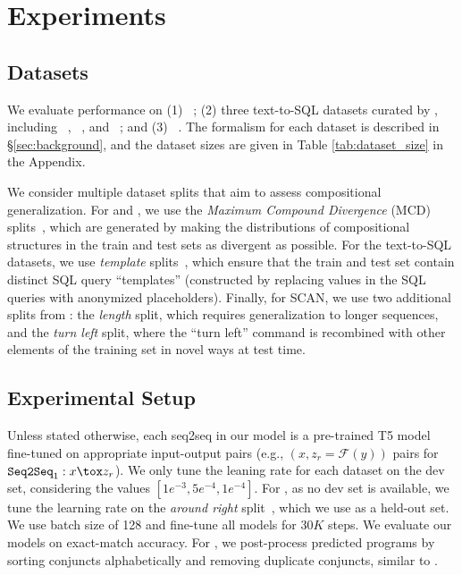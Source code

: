\section{Experiments}
\label{sec:experiments}

\subsection{Datasets}
\label{ssec:datasets}

We evaluate performance on (1) \cfq{}~\cite{keysers2019measuring}; (2) three text-to-SQL datasets curated by \citet{finegan-dollak-etal-2018-improving}, including \geo{}~\cite{zelle-mooney-1996-learning}, \atis{}~\cite{dahl-etal-1994-expanding}, and \scholar{}~\cite{iyer-etal-2017-learning};
and (3) \scan{}~\cite{lake2018generalization}.
The formalism for each dataset is described in \S\ref{sec:background}, and the dataset sizes are given in Table \ref{tab:dataset_size} in the Appendix.

We consider multiple dataset splits that aim to assess compositional generalization.
For \cfq{} and \scan{}, we use the \emph{Maximum Compound Divergence} (MCD) splits~\cite{keysers2019measuring}, which are generated by making the distributions of compositional structures in the train and test sets as divergent as possible.
For the text-to-SQL datasets, we use \emph{template} splits~\cite{finegan-dollak-etal-2018-improving}, which ensure that the train and test set contain distinct SQL query ``templates'' (constructed by replacing values in the SQL queries with anonymized placeholders).
Finally, for SCAN, we use two additional splits from \citet{lake2018generalization}: the \emph{length} split, which requires generalization to longer sequences, and the \emph{turn left} split, where the ``turn left'' command is recombined with other elements of the training set in novel ways at test time.


\subsection{Experimental Setup}
Unless stated otherwise, each seq2seq in our model is a pre-trained T5 model~\cite{raffel2020exploring} fine-tuned on appropriate input-output pairs (e.g., $(x, z_r = \mathcal{F}(y))$ pairs for $\texttt{Seq2Seq}_1: x\tox z_r$).
We only tune the leaning rate for each dataset on the dev set, considering the values $[1e^{-3}, 5e^{-4}, 1e^{-4}]$. For \scan{}, as no dev set is available, we tune the learning rate on the \textit{around right} split~\cite{loula-etal-2018-rearranging}, which we use as a held-out set. We use batch size of 128 and fine-tune all models for $30K$ steps. We evaluate our models on exact-match accuracy. 
For \cfq{}, we post-process predicted programs by sorting conjuncts alphabetically and removing duplicate conjuncts, similar to \citet{guo2020hierarchical}.

